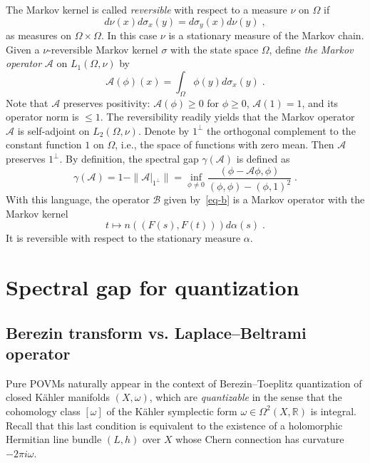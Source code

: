 \documentclass[11pt]{article}
\theoremstyle{definition}
\numberwithin{equation}{section}
\numberwithin{figure}{section}
\numberwithin{table}{section}
\newcommand{\R}{{\mathbb{R}}}
\newcommand{\cA}{{\mathcal{A}}}
\newcommand{\cB}{{\mathcal{B}}}
\newcommand{\om}{{\omega}}
\newcommand{\Om}{\Omega}
\renewcommand\leq {\leqslant}
\renewcommand\geq {\geqslant}
\newcommand\< {\mathcal{h}}
\renewcommand\> {\mathcal{i}}
\begin{document}
The Markov kernel is called \emph{reversible} with respect to a measure $\nu$ on $\Omega$ if
\[
d\nu(x) d\sigma_x(y) = d\sigma_y(x) d\nu(y)\;,
\]
as measures on $\Omega \times \Omega$. In this case
$\nu$ is a stationary measure of the Markov chain. Given a $\nu$-reversible Markov kernel $\sigma$ with the state space $\Omega$, define \emph{the Markov operator} $\cA$ on $L_1(\Omega,\nu)$ by
\begin{equation}\label{eq-cP}
\cA(\phi)(x) = \int_\Omega \phi(y)d\sigma_x (y)\;.
\end{equation}
Note that $\cA$ preserves positivity: $\cA(\phi)\geq 0$ for $\phi \geq 0$, $\cA(1)=1$, and its operator norm is $\leq 1$. The reversibility readily yields that the Markov operator $\cA$ is self-adjoint on $L_2(\Omega, \nu)$. Denote by $1^\bot$ the orthogonal complement to the constant function $1$ on $\Omega$, i.e., the space of functions with zero mean. Then $\cA$ preserves $1^\bot$. By definition, the spectral gap $\gamma(\cA)$ is defined as
\begin{equation}\label{gap-Markov}
\gamma(\cA) = 1- \|\cA|_{1^\bot}\| = \inf_{\phi \neq 0} \frac{(\phi -\cA\phi,\phi)}{(\phi,\phi)-(\phi,1)^2}\;.
\end{equation}
With this language, the operator $\cB$ given by~\eqref{eq-b} is a Markov operator with the Markov kernel
\begin{equation}\label{eq-kernel}
t \mapsto n((F(s),F(t)))d\alpha(s)\;.
\end{equation}
It is reversible with respect to the stationary measure $\alpha$.



\section{Spectral gap for quantization}\label{subsec-BT}

\subsection{Berezin transform vs. Laplace--Beltrami operator}\label{subsec-BLB}
Pure POVMs naturally appear in the context of Berezin--Toeplitz quantization of closed K\"ahler manifolds $(X,\om)$, which are
\emph{quantizable} in the sense that the cohomology class $[\om]$ of the K\"ahler symplectic form $\om\in\Om^2(X,\R)$ is integral. Recall that this last condition is equivalent to the existence of a holomorphic Hermitian line bundle $(L,h)$ over $X$ whose Chern connection has curvature $-2\pi i\omega$.
\end{document}

